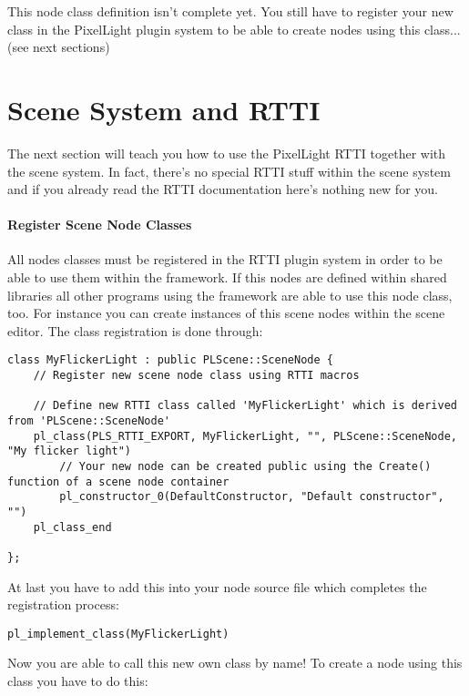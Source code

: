 This node class definition isn't complete yet. You still have to register your new class in the PixelLight plugin system to be able to create nodes using this class... (see next sections)




\section{Scene System and \ac{RTTI}}
The next section will teach you how to use the PixelLight \ac{RTTI} together with the scene system. In fact, there's no special \ac{RTTI} stuff within the scene system and if you already read the \ac{RTTI} documentation here's nothing new for you.


\paragraph{Register Scene Node Classes}
All nodes classes must be registered in the \ac{RTTI} plugin system in order to be able to use them within the framework. If this nodes are defined within shared libraries all other programs using the framework are able to use this node class, too. For instance you can create instances of this scene nodes within the scene editor. The class registration is done through:

\begin{lstlisting}[caption=\ac{RTTI} and own new scene node class]
class MyFlickerLight : public PLScene::SceneNode {
	// Register new scene node class using RTTI macros

	// Define new RTTI class called 'MyFlickerLight' which is derived from 'PLScene::SceneNode'
	pl_class(PLS_RTTI_EXPORT, MyFlickerLight, "", PLScene::SceneNode, "My flicker light")
		// Your new node can be created public using the Create() function of a scene node container
		pl_constructor_0(DefaultConstructor, "Default constructor", "")
	pl_class_end

};
\end{lstlisting}

At last you have to add this into your node source file which completes the registration process:

\begin{lstlisting}[caption=Finishing \ac{RTTI} class registration process]
pl_implement_class(MyFlickerLight)
\end{lstlisting}

Now you are able to call this new own class by name! To create a node using this class you have to do this:

